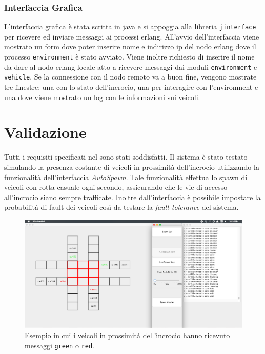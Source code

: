 \documentclass{memoir}
\begin{document}
\subsection{Interfaccia Grafica}
L'interfaccia grafica è stata scritta in java e si appoggia alla libreria
\texttt{jinterface} per ricevere ed inviare messaggi ai processi erlang.
All'avvio dell'interfaccia viene mostrato un form dove poter inserire nome e
indirizzo ip del nodo erlang dove il processo \texttt{environment} è stato
avviato. Viene inoltre richiesto di inserire il nome da dare al nodo erlang
locale atto a ricevere messaggi dai moduli \texttt{environment} e
\texttt{vehicle}. Se la connessione con il nodo remoto va a buon fine, vengono
mostrate tre finestre: una con lo stato dell'incrocio, una per interagire con
l'environment e una dove viene mostrato un log con le informazioni sui veicoli.

%
%
%

\chapter{Validazione}
Tutti i requisiti specificati nel  sono stati soddisfatti. Il
sistema è stato testato simulando la presenza costante di veicoli in prossimità
dell'incrocio utilizzando la funzionalità dell'interfaccia \emph{AutoSpawn}.
Tale funzionalità effettua lo spawn di veicoli con rotta casuale ogni secondo,
assicurando che le vie di accesso all'incrocio siano sempre trafficate. Inoltre
dall'interfaccia è possibile impostare la probabilità di fault dei veicoli così
da testare la \emph{fault-tolerance} del sistema.

\begin{figure}
\centering
\includegraphics[width=\textwidth]{greenred}
\caption{Esempio in cui i veicoli in prossimità dell'incrocio hanno ricevuto
  messaggi \texttt{green} o \texttt{red}.}
\end{figure}
\end{document}
